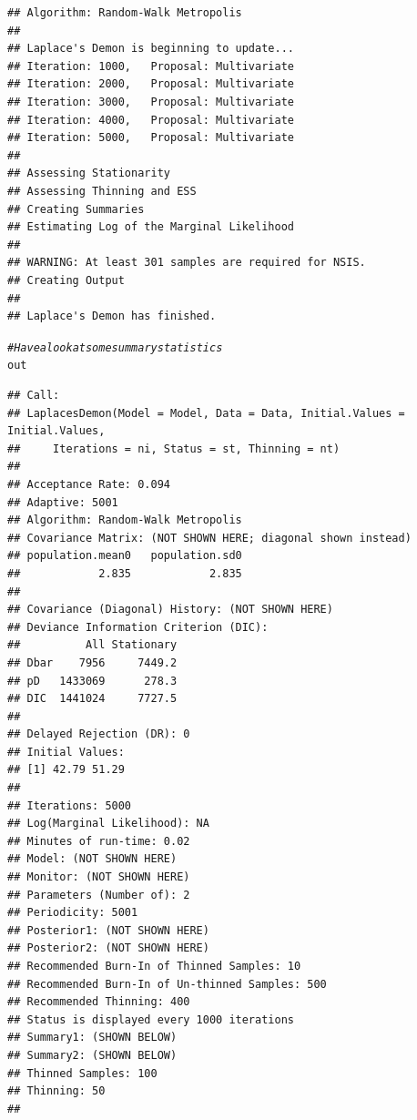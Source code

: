 \documentclass{article}\usepackage[]{graphicx}\usepackage[]{color}
\makeatletter
\newcommand{\hlcom}[1]{\textcolor[rgb]{0.678,0.584,0.686}{\textit{#1}}}%
\newcommand{\hlstd}[1]{\textcolor[rgb]{0.345,0.345,0.345}{#1}}%
\newenvironment{kframe}{%
 \def\at@end@of@kframe{}%
 \ifinner\ifhmode%
  \def\at@end@of@kframe{\end{minipage}}%
  \begin{minipage}{\columnwidth}%
 \fi\fi%
 \def\FrameCommand##1{\hskip\@totalleftmargin \hskip-\fboxsep
 \colorbox{shadecolor}{##1}\hskip-\fboxsep
     \hskip-\linewidth \hskip-\@totalleftmargin \hskip\columnwidth}%
 \MakeFramed {\advance\hsize-\width
   \@totalleftmargin\z@ \linewidth\hsize
   \@setminipage}}%
 {\par\unskip\endMakeFramed%
 \at@end@of@kframe}
\newenvironment{knitrout}{}{} %
\makeatother
\begin{document}
\begin{knitrout}
\begin{kframe}
{\ttfamily\noindent\color{warningcolor}{\#\# Warning: NaNs produced\\\#\# Warning: NAs produced\\\#\# Warning: NaNs produced\\\#\# Warning: NAs produced\\\#\# Warning: NaNs produced\\\#\# Warning: NAs produced\\\#\# Warning: NaNs produced\\\#\# Warning: NAs produced}}\begin{verbatim}
## Algorithm: Random-Walk Metropolis 
## 
## Laplace's Demon is beginning to update...
## Iteration: 1000,   Proposal: Multivariate
## Iteration: 2000,   Proposal: Multivariate
## Iteration: 3000,   Proposal: Multivariate
## Iteration: 4000,   Proposal: Multivariate
## Iteration: 5000,   Proposal: Multivariate
## 
## Assessing Stationarity
## Assessing Thinning and ESS
## Creating Summaries
## Estimating Log of the Marginal Likelihood
## 
## WARNING: At least 301 samples are required for NSIS.
## Creating Output
## 
## Laplace's Demon has finished.
\end{verbatim}
\begin{alltt}
\hlcom{# Have a look at some summary statistics}
\hlstd{out}
\end{alltt}
\begin{verbatim}
## Call:
## LaplacesDemon(Model = Model, Data = Data, Initial.Values = Initial.Values, 
##     Iterations = ni, Status = st, Thinning = nt)
## 
## Acceptance Rate: 0.094
## Adaptive: 5001
## Algorithm: Random-Walk Metropolis
## Covariance Matrix: (NOT SHOWN HERE; diagonal shown instead)
## population.mean0   population.sd0 
##            2.835            2.835 
## 
## Covariance (Diagonal) History: (NOT SHOWN HERE)
## Deviance Information Criterion (DIC):
##          All Stationary
## Dbar    7956     7449.2
## pD   1433069      278.3
## DIC  1441024     7727.5
## 
## Delayed Rejection (DR): 0
## Initial Values:
## [1] 42.79 51.29
## 
## Iterations: 5000
## Log(Marginal Likelihood): NA
## Minutes of run-time: 0.02
## Model: (NOT SHOWN HERE)
## Monitor: (NOT SHOWN HERE)
## Parameters (Number of): 2
## Periodicity: 5001
## Posterior1: (NOT SHOWN HERE)
## Posterior2: (NOT SHOWN HERE)
## Recommended Burn-In of Thinned Samples: 10
## Recommended Burn-In of Un-thinned Samples: 500
## Recommended Thinning: 400
## Status is displayed every 1000 iterations
## Summary1: (SHOWN BELOW)
## Summary2: (SHOWN BELOW)
## Thinned Samples: 100
## Thinning: 50
## 

\end{verbatim}
\end{kframe}
\end{knitrout}
\end{document}
